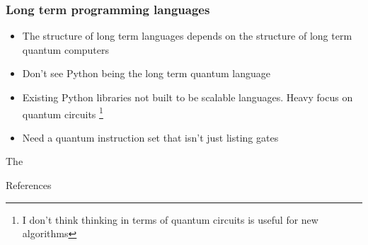 \documentclass{beamer}
\begin{document}
\begin{frame}
\frametitle{Long term programming languages}
\begin{itemize}
\item The structure of long term languages depends on the structure of long term quantum computers
\item Don't see Python being the long term quantum language 
\item Existing Python libraries not built to be scalable languages. Heavy focus on quantum circuits \footnote{I don't think thinking in terms of quantum circuits is useful for new algorithms}
\item Need a quantum instruction set that isn't just listing gates
\end{itemize}
\end{frame}

\begin{frame}{The}

\end{frame}

\begin{frame}{References}


\end{frame}
\end{document}
